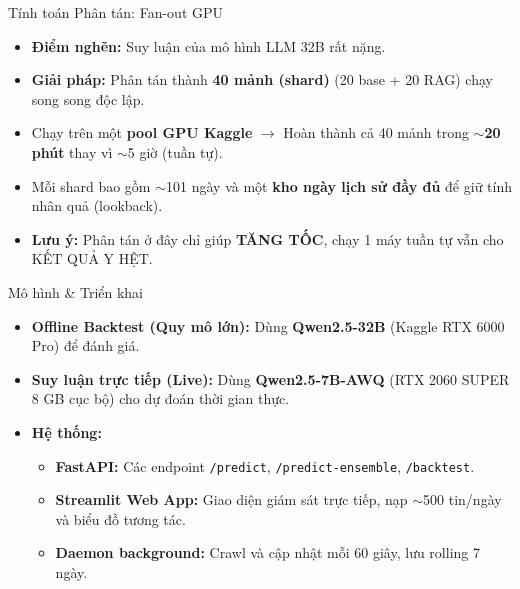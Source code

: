 \documentclass[aspectratio=169, 10pt]{beamer}
\begin{document}
\begin{frame}{Tính toán Phân tán: Fan-out GPU}
    \begin{itemize}
        \item \textbf{Điểm nghẽn:} Suy luận của mô hình LLM 32B rất nặng.
        \item \textbf{Giải pháp:} Phân tán thành \textbf{40 mảnh (shard)} (20 base + 20 RAG) chạy song song độc lập.
        \item Chạy trên một \textbf{pool GPU Kaggle} $\rightarrow$ Hoàn thành cả 40 mảnh trong \textbf{$\sim$20 phút} thay vì $\sim$5 giờ (tuần tự).
        \item Mỗi shard bao gồm $\sim$101 ngày và một \textbf{kho ngày lịch sử đầy đủ} để giữ tính nhân quả (lookback).
        \item \textbf{Lưu ý:} Phân tán ở đây chỉ giúp \textbf{TĂNG TỐC}, chạy 1 máy tuần tự vẫn cho KẾT QUẢ Y HỆT.
    \end{itemize}
\end{frame}

\begin{frame}{Mô hình \& Triển khai}
    \begin{itemize}
        \item \textbf{Offline Backtest (Quy mô lớn):} Dùng \textbf{Qwen2.5-32B} (Kaggle RTX 6000 Pro) để đánh giá.
        \item \textbf{Suy luận trực tiếp (Live):} Dùng \textbf{Qwen2.5-7B-AWQ} (RTX 2060 SUPER 8 GB cục bộ) cho dự đoán thời gian thực.
        \item \textbf{Hệ thống:}
        \begin{itemize}
            \item \textbf{FastAPI:} Các endpoint \texttt{/predict}, \texttt{/predict-ensemble}, \texttt{/backtest}.
            \item \textbf{Streamlit Web App:} Giao diện giám sát trực tiếp, nạp $\sim$500 tin/ngày và biểu đồ tương tác.
            \item \textbf{Daemon background:} Crawl và cập nhật mỗi 60 giây, lưu rolling 7 ngày.
        \end{itemize}
    \end{itemize}
\end{frame}
\end{document}
